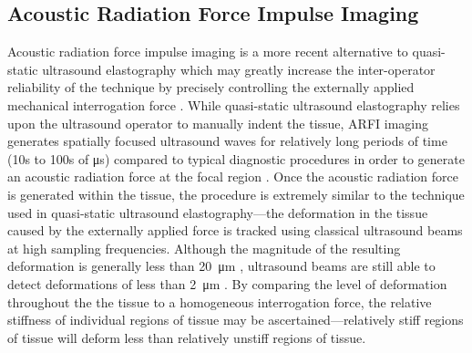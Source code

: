 		\subsection{Acoustic Radiation Force Impulse Imaging}
			Acoustic radiation force impulse imaging is a more recent alternative to quasi-static ultrasound elastography which may greatly increase the inter-operator reliability of the technique by precisely controlling the externally applied mechanical interrogation force \cite{nightingale00-1,nightingale01}. While quasi-static ultrasound elastography relies upon the ultrasound operator to manually indent the tissue, ARFI imaging generates spatially focused ultrasound waves for relatively long periods of time (10s to 100s of \si{\micro\second}) compared to typical diagnostic procedures in order to generate an acoustic radiation force at the focal region \cite{nightingale02,nightingale02-7,palmeri05}. Once the acoustic radiation force is generated within the tissue, the procedure is extremely similar to the technique used in quasi-static ultrasound elastography---the deformation in the tissue caused by the externally applied force is tracked using classical ultrasound beams at high sampling frequencies. Although the magnitude of the resulting deformation is generally less than \SI{20}{\um} \cite{nightingale02}, ultrasound beams are still able to detect deformations of less than \SI{2}{\um} \cite{SiemensVirtualTouch,pinton06}. By comparing the level of deformation throughout the the tissue to a homogeneous interrogation force, the relative stiffness of individual regions of tissue may be ascertained---relatively stiff regions of tissue will deform less than relatively unstiff regions of tissue.

